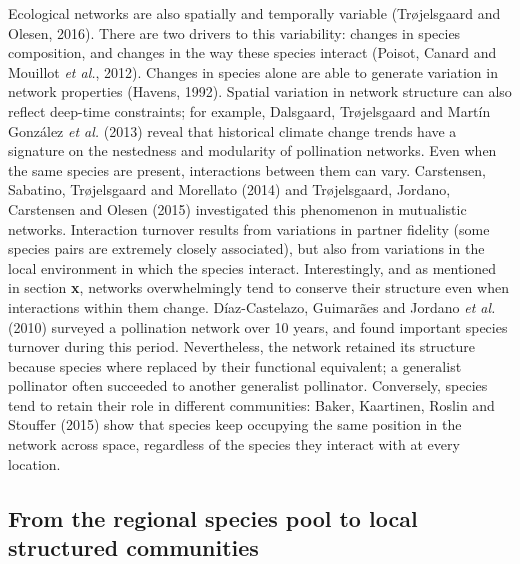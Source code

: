 \documentclass[12pt]{article}
\begin{document}
Ecological networks are also spatially and temporally variable
(Trøjelsgaard and Olesen, 2016). There are two drivers to this
variability: changes in species composition, and changes in the way
these species interact (Poisot, Canard and Mouillot \emph{et al.},
2012). Changes in species alone are able to generate variation in
network properties (Havens, 1992). Spatial variation in network
structure can also reflect deep-time constraints; for example,
Dalsgaard, Trøjelsgaard and Martín González \emph{et al.} (2013) reveal
that historical climate change trends have a signature on the nestedness
and modularity of pollination networks. Even when the same species are
present, interactions between them can vary. Carstensen, Sabatino,
Trøjelsgaard and Morellato (2014) and Trøjelsgaard, Jordano, Carstensen
and Olesen (2015) investigated this phenomenon in mutualistic networks.
Interaction turnover results from variations in partner fidelity (some
species pairs are extremely closely associated), but also from
variations in the local environment in which the species interact.
Interestingly, and as mentioned in section \textbf{x}, networks
overwhelmingly tend to conserve their structure even when interactions
within them change. Díaz-Castelazo, Guimarães and Jordano \emph{et al.}
(2010) surveyed a pollination network over 10 years, and found important
species turnover during this period. Nevertheless, the network retained
its structure because species where replaced by their functional
equivalent; a generalist pollinator often succeeded to another
generalist pollinator. Conversely, species tend to retain their role in
different communities: Baker, Kaartinen, Roslin and Stouffer (2015) show
that species keep occupying the same position in the network across
space, regardless of the species they interact with at every location.

\subsection{From the regional species pool to local structured
communities}\label{from-the-regional-species-pool-to-local-structured-communities}
\end{document}
